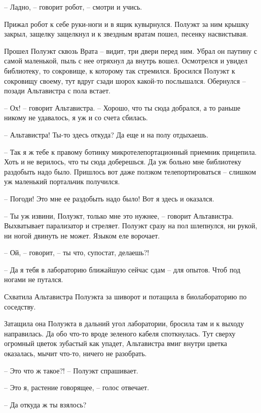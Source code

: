 \documentclass[ebook,oneside,final,openright]{memoir}
\begin{document}
– Ладно, – говорит робот, – смотри и учись. \par
Прижал робот к себе руки-ноги и в ящик кувырнулся. Полуэкт за ним крышку закрыл, защелку защелкнул и к звездным вратам пошел, песенку насвистывая.\par
\par
Прошел Полуэкт сквозь Врата – видит, три двери перед ним. Убрал он паутину с самой маленькой, пыль с нее отряхнул да внутрь вошел. Осмотрелся и увидел библиотеку, то сокровище, к которому так стремился. Бросился Полуэкт к сокровищу своему, тут вдруг сзади шорох какой-то послышался. Обернулся – позади Альтавистра с пола встает.\par
– Ох! – говорит Альтавистра. – Хорошо, что ты сюда добрался, а то раньше никому не удавалось, я уж и со счета сбилась.\par
– Альтавистра! Ты-то здесь откуда? Да еще и на полу отдыхаешь.\par
– Так я ж тебе к правому ботинку микротелепортационный приемник прицепила. Хоть и не верилось, что ты сюда доберешься. Да уж больно мне библиотеку раздобыть надо было. Пришлось вот даже ползком телепортироваться – слишком уж маленький портальчик получился.\par
– Погоди! Это мне ее раздобыть надо было! Вот я здесь и оказался.\par
– Ты уж извини, Полуэкт, только мне это нужнее, – говорит Альтавистра. Выхватывает парализатор и стреляет. Полуэкт сразу на пол шлепнулся, ни рукой, ни ногой двинуть не может. Языком еле ворочает.\par
– Ой, – говорит, – ты что, супостат, делаешь?!\par
– Да я тебя в лабораторию ближайшую сейчас сдам – для опытов. Чтоб под ногами не путался.\par
Схватила Альтавистра Полуэкта за шиворот и потащила в биолабораторию по соседству.\par
\par
Затащила она Полуэкта в дальний угол лаборатории, бросила там и к выходу направилась. Да обо что-то вроде зеленого кабеля споткнулась. Тут сверху огромный цветок зубастый как упадет, Альтавистра вмиг внутри цветка оказалась, мычит что-то, ничего не разобрать.\par
\par
– Это что ж такое?! – Полуэкт спрашивает.\par
– Это я, растение говорящее, – голос отвечает.\par
– Да откуда ж ты взялось?\par
\end{document}
